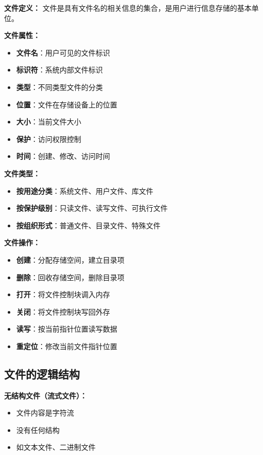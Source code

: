 \documentclass[lang=cn,newtx,10pt,scheme=chinese]{../../elegantbook}
\begin{document}
\textbf{文件定义：}
文件是具有文件名的相关信息的集合，是用户进行信息存储的基本单位。

\textbf{文件属性：}
\begin{itemize}
  \item \textbf{文件名}：用户可见的文件标识
  \item \textbf{标识符}：系统内部文件标识
  \item \textbf{类型}：不同类型文件的分类
  \item \textbf{位置}：文件在存储设备上的位置
  \item \textbf{大小}：当前文件大小
  \item \textbf{保护}：访问权限控制
  \item \textbf{时间}：创建、修改、访问时间
\end{itemize}

\textbf{文件类型：}
\begin{itemize}
  \item \textbf{按用途分类}：系统文件、用户文件、库文件
  \item \textbf{按保护级别}：只读文件、读写文件、可执行文件
  \item \textbf{按组织形式}：普通文件、目录文件、特殊文件
\end{itemize}

\textbf{文件操作：}
\begin{itemize}
  \item \textbf{创建}：分配存储空间，建立目录项
  \item \textbf{删除}：回收存储空间，删除目录项
  \item \textbf{打开}：将文件控制块调入内存
  \item \textbf{关闭}：将文件控制块写回外存
  \item \textbf{读写}：按当前指针位置读写数据
  \item \textbf{重定位}：修改当前文件指针位置
\end{itemize}

\subsection{文件的逻辑结构}

\textbf{无结构文件（流式文件）：}
\begin{itemize}
  \item 文件内容是字符流
  \item 没有任何结构
  \item 如文本文件、二进制文件
\end{itemize}
\end{document}
